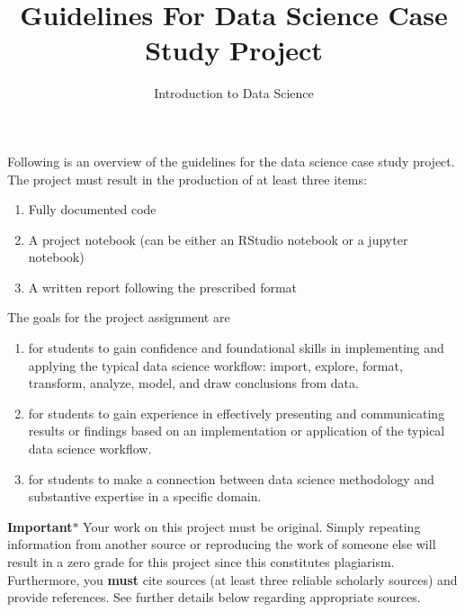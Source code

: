 \documentclass[12pt]{article}
\title{Guidelines For Data Science Case Study Project}
\author{Introduction to Data Science}
\date{ }
\begin{document}
\maketitle

Following is an overview of the guidelines for the data science case study project. The project must result in the production of at least three items:
\begin{enumerate}
    \item Fully documented code
    \item A project notebook (can be either an RStudio notebook or a jupyter notebook)
    \item A written report following the prescribed format
\end{enumerate}


The goals for the project assignment are
\begin{enumerate}
  \item for students to gain confidence and foundational skills in implementing and applying the typical data science workflow: import, explore, format, transform, analyze, model, and draw conclusions from data.
  \item for students  to gain experience in effectively presenting and communicating results or findings based on an implementation or application of the typical data science workflow.
  \item for students to make a connection between data science methodology and substantive expertise in a specific domain.
\end{enumerate}

{\bf Important}$\ast$ Your work on this project must be original. Simply repeating information from another source or reproducing the work of someone else will result in a zero grade for this project since this constitutes plagiarism. Furthermore, you {\bf must} cite sources (at least three reliable scholarly sources) and provide references. See further details below regarding appropriate sources.
\end{document}
